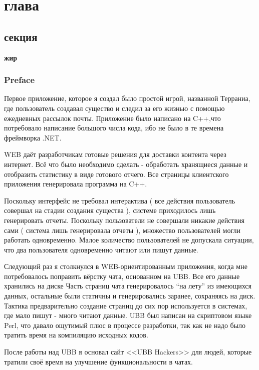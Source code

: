 \chapter{ глава } \label{chapt1}


\section{ секция} \label{sect1_1}

\textbf{жир} 

\subsection{Preface} \label{subsect1_1_1}

Первое приложение, которое я создал было простой игрой, названной Терраниа, где пользователь создавал существо и следил за его жизнью с помощью ежедневных рассылок почты. Приложение было написано на C++,что потребовало написание большого числа кода, ибо не было в те времена фреймворка .NET.

WEB  даёт разработчикам готовые решения для доставки контента через интернет. Всё что было необходимо сделать - обработать хранящиеся данные и отобразить статистику в виде готового отчего. Все страницы клиентского приложения генерировала программа на C++.

Поскольку интерфейс не требовал интерактива ( все действия пользователь совершал на стадии создания существа ),  системе приходилось лишь генерировать отчеты. Поскольку пользователи не совершали никакие действия сами ( система лишь генерировала отчеты ), множество пользователей могли работать одновременно. Малое количество пользователей не допускала ситуации, что два пользователя одновременно читают или пишут данные.


Следующий раз я столкнулся в WEB-ориентированным приложения, когда мне потребовалось поправить вёрстку чата, основанном на  UBB. Все его данные хранились на диске Часть страниц чата генерировалось ``на лету'' из имеющихся данных, остальные были статичны и генерировались заранее, сохраняясь на диск. Тактика предварительно создание страниц до сих пор используется в системах, где мало пишут - много читают данные. UBB был написан на скриптовом языке Perl, что давало ощутимый плюс в процессе разработки, так как не надо было тратить время на компиляцию исходных кодов.

После работы над UBB я основал сайт <<UBB Hackers>> для людей, которые тратили своё время на улучшение функциональности в чатах. 

